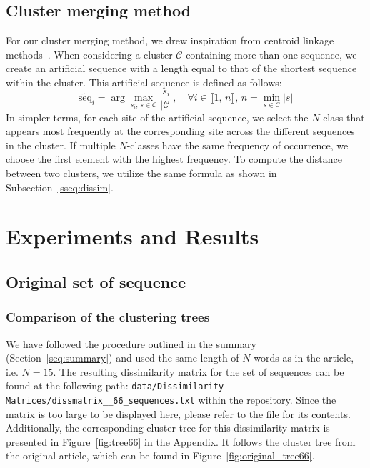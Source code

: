 \documentclass[english,13pt,a4paper]{article}
\theoremstyle{definition}
\theoremstyle{remark}
\theoremstyle{defstyle}
\begin{document}
\subsection{Cluster merging method}\label{ssec:merge}

For our cluster merging method, we drew inspiration from centroid linkage methods~\cite{duda1973pattern}. When considering a cluster $\mathcal{C}$ containing more than one sequence, we create an artificial sequence with a length equal to that of the shortest sequence within the cluster. This artificial sequence is defined as follows:
\[
    \widetilde{\text{seq}}_i = \arg \max_{s_i; \,s \in \mathcal C} \frac{s_i}{|\mathcal C|},  \quad \forall i \in \llbracket 1, \, n \rrbracket, \, n = \min_{s \in \mathcal{C}} |s| 
\]
In simpler terms, for each site of the artificial sequence, we select the $N$-class that appears most frequently at the corresponding site across the different sequences in the cluster. If multiple $N$-classes have the same frequency of occurrence, we choose the first element with the highest frequency. To compute the distance between two clusters, we utilize the same formula as shown in Subsection~\ref{sseq:dissim}. 



\section{Experiments and Results}

\subsection{Original set of sequence}

\subsubsection{Comparison of the clustering trees}

We have followed the procedure outlined in the summary (Section~\ref{seq:summary}) and used the same length of $N$-words as in the article, i.e. $N=15$. The resulting dissimilarity matrix for the set of sequences can be found at the following path: \texttt{data/Dissimilarity Matrices/dissmatrix\_\_66\_sequences.txt} within the repository. Since the matrix is too large to be displayed here, please refer to the file for its contents. Additionally, the corresponding cluster tree for this dissimilarity matrix is presented in Figure~\ref{fig:tree66} in the Appendix. It follows the cluster tree from the original article, which can be found in Figure~\ref{fig:original_tree66}.\\
\end{document}
